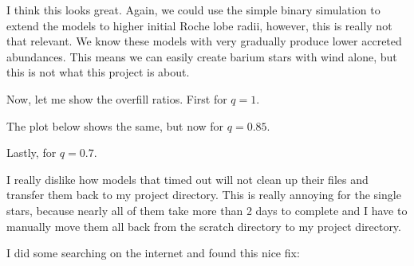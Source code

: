 \documentclass[a4paper,10pt]{article}
\begin{document}
\begin{figure}[ht]
	\centering
\end{figure}

I think this looks great.
Again, we could use the simple binary simulation to
extend the models to higher initial Roche lobe radii, however, this is really not that relevant.
We know these models with very gradually produce lower accreted abundances.
This means
we can easily create barium stars with wind alone, but this is not what this project is about.

Now, let me show the overfill ratios.
First for \(q=1\).
\begin{figure}[ht]
	\centering
\end{figure}

The plot below shows the same, but now for \(q=0.85\).
\begin{figure}[ht]
	\centering
\end{figure}
\nextpage
Lastly, for \(q=0.7\).
\begin{figure}[ht]
	\centering
\end{figure}

\begin{figure}[ht]
	\centering
\end{figure}


I really dislike how models that timed out will not clean up their files and transfer them back to my project directory.
This is really annoying for the single stars, because nearly all of them take more than 2 days to complete and
I have to manually move them all back from the scratch directory to my project directory.

I did some searching on the internet and found this nice fix:
\end{document}
